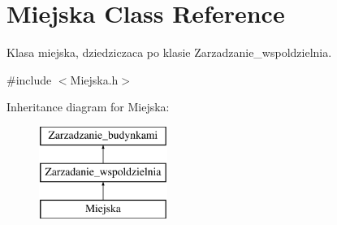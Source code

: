 \hypertarget{class_miejska}{}\section{Miejska Class Reference}
\label{class_miejska}


Klasa miejska, dziedziczaca po klasie Zarzadzanie\+\_\+wspoldzielnia.  




{\ttfamily \#include $<$Miejska.\+h$>$}

Inheritance diagram for Miejska\+:\begin{figure}[H]
\begin{center}
\leavevmode
\includegraphics[height=3.000000cm]{class_miejska}
\end{center}
\end{figure}
